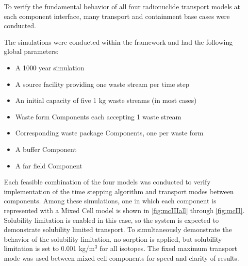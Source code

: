 
To verify the fundamental behavior of all four \Cyder radionuclide transport models at
each component interface, many transport and containment base cases were
conducted.

The simulations were conducted within the \Cyclus framework and had the
following global parameters:

\begin{itemize}
\item{A 1000 year simulation}
\item{A source facility providing one waste stream per time step}
\item{An initial capacity of five 1 kg waste streams (in most cases)}
\item{Waste form Components each accepting 1 waste stream}
\item{Corresponding waste package Components, one per waste form}
\item{A buffer Component}
\item{A far field Component}

\end{itemize}


Each feasible combination of the four models was conducted to verify
implementation of the time stepping algorithm and transport modes between
components. Among these simulations, one in which each component is represented with a Mixed
Cell model is shown in \ref{fig:mcIIIall} through \ref{fig:mcII}.  Solubility
limitation is enabled in this case, so the system is expected to demonstrate
solubility limited transport.  To simultaneously demonstrate the behavior of
the solubility limitation, no sorption is applied, but solubility limitation is
set to 0.001 kg/m$^3$ for all isotopes.  The fixed maximum transport mode was
used between mixed cell components for speed and clarity of results.



\FloatBarrier

